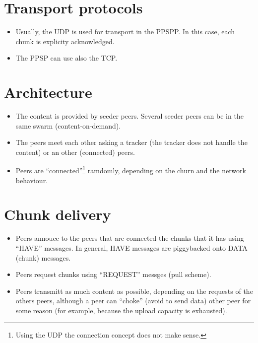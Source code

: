 
\section{Transport protocols}

\begin{itemize}
\item Usually, the UDP is used for transport in the PPSPP. In this
  case, each chunk is explicity acknowledged.
\item The PPSP can use also the TCP.
\end{itemize}


\section{Architecture}

\begin{itemize}
\item The content is provided by seeder peers. Several seeder peers
  can be in the same swarm (content-on-demand).
\item The peers meet each other asking a tracker (the tracker does not
  handle the content) or an other (connected) peers.
\item Peers are ``connected''\footnote{Using the UDP the connection
    concept does not make sense.} ramdomly, depending on the churn and
  the network behaviour.
\end{itemize}


\section{Chunk delivery}

\begin{itemize}
\item Peers annouce to the peers that are connected the chunks that it
  has using ``HAVE'' messages. In general, HAVE messages are
  piggybacked onto DATA (chunk) messages.
\item Peers request chunks using ``REQUEST'' messges (pull scheme).
\item Peers transmitt as much content as possible, depending on the
  requests of the others peers, although a peer can ``choke'' (avoid
  to send data) other peer for some reason (for example, because the
  upload capacity is exhausted).
\end{itemize}

